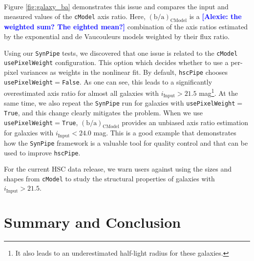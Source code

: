 \documentclass[useamsfonts]{pasj01}
\newcommand{\alexie}[1]{\textcolor{blue}{\textbf{[Alexie: #1]}}}
\def\hscpipe{\texttt{hscPipe}}
\def\synpipe{\texttt{SynPipe}}
\def\cmodel{\texttt{cModel}}
\begin{document}
    Figure \ref{fig:galaxy_ba} demonstrates this issue and compares the  input and measured values of the  \cmodel{} axis ratio. Here, $({\mathrm{b}/\mathrm{a}})_{\mathrm{CModel}}$ is a \alexie{the weighted sum? The eighted mean?} combination of the
    axis ratios estimated by the exponential and de Vaucouleurs models weighted by 
    their flux ratio.
    
    Using our \synpipe{} tests, we discovered that one issue is related to the  \cmodel{} \texttt{usePixelWeight} configuration. This option which decides whether to
    use a per-pixel variances as weights in the nonlinear fit. By default, \hscpipe{} chooses \texttt{usePixelWeight}$=$\texttt{False}.
    As one can see, this leads to a significantly overestimated axis ratio for almost
    all galaxies with $i_{\mathrm{Input}}>21.5$ mag\footnote{It also leads to an
    underestimated half-light radius for these galaxies.}.
    At the same time, we also repeat the \synpipe{} run for galaxies with
    \texttt{usePixelWeight}$=$\texttt{True}, and this change clearly mitigates
    the problem. When we use \texttt{usePixelWeight}$=$\texttt{True},
    $({\mathrm{b}/\mathrm{a}})_{\mathrm{CModel}}$ provides an unbiased axis ratio 
    estimation for galaxies with $i_{\mathrm{Input}}< 24.0$ mag.  This  is a good example  that  demonstrates how the \synpipe{} framework is a valuable tool  for quality control and that can be used to improve \hscpipe{}.

    For the current HSC data release, we warn users against using the sizes and shapes from \cmodel{} to study the structural properties of galaxies with $i_{\mathrm{Input}}>21.5$.
    


\section{Summary and Conclusion}
    \label{sec:summary}
\end{document}
